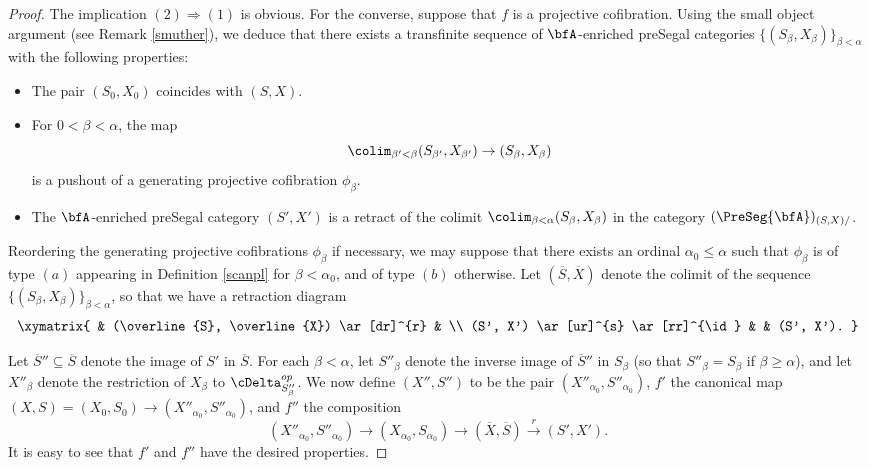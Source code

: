 \begin{proof}
The implication $(2) \Rightarrow (1)$ is obvious. For the converse, suppose that
$f$ is a projective cofibration. Using the small object argument (see Remark \ref{smuther}), we deduce
that there exists a transfinite sequence of $\bfA$-enriched preSegal categories
$\{ (S_{\beta}, X_{\beta}) \}_{ \beta < \alpha}$ with the following properties:
\begin{itemize}
\item The pair $(S_0, X_0)$ coincides with $(S,X)$.
\item For $0 < \beta < \alpha$, the map 
$$\colim_{\beta' < \beta} (S_{\beta'}, X_{\beta'}) \rightarrow (S_{\beta}, X_{\beta} )$$
is a pushout of a generating projective cofibration $\phi_{\beta}$.
\item The $\bfA$-enriched preSegal category $(S',X')$ is a retract of
the colimit $\colim_{ \beta < \alpha} (S_{\beta}, X_{\beta})$ in the category
$(\PreSeg{\bfA})_{ (S,X)/}$. 
\end{itemize}
Reordering the generating projective cofibrations $\phi_{\beta}$ if necessary, we may suppose that
there exists an ordinal $\alpha_0 \leq \alpha$ such that $\phi_{\beta}$ is of type
$(a)$ appearing in Definition \ref{scanpl} for $\beta < \alpha_0$, and of type $(b)$
otherwise. Let $( \overline{S}, \overline{X} )$ denote the colimit of the sequence
$\{ (S_{\beta}, X_{\beta} ) \}_{ \beta < \alpha}$, so that we have a retraction diagram
$$ \xymatrix{ & (\overline{S}, \overline{X}) \ar[dr]^{r} & \\
(S', X') \ar[ur]^{s} \ar[rr]^{\id} & & (S', X'). }$$

Let $\overline{S}'' \subseteq \overline{S}$ denote the image of $S'$ in $\overline{S}$.
For each $\beta < \alpha$, let $S''_{\beta}$ denote the inverse image of $\overline{S}''$ in
$S_{\beta}$ (so that $S''_{\beta} = S_{\beta}$ if $\beta \geq \alpha$), and let
$X''_{\beta}$ denote the restriction of $X_{\beta}$ to $\cDelta^{op}_{ S''_{\beta} }$. 
We now define $(X'',S'')$ to be the pair $(X''_{\alpha_0}, S''_{\alpha_0})$, 
$f'$ the canonical map $(X,S) = (X_0,S_0) \rightarrow (X''_{\alpha_0}, S''_{\alpha_0})$, and
$f''$ the composition
$$ ( X''_{\alpha_0}, S''_{\alpha_0}) \rightarrow (X_{\alpha_0}, S_{\alpha_0})
\rightarrow ( \overline{X}, \overline{S} ) \stackrel{r}{\rightarrow} (S', X').$$
It is easy to see that $f'$ and $f''$ have the desired properties.
\end{proof}

